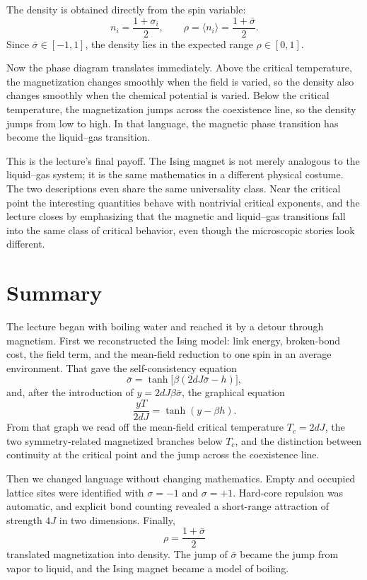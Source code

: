 The density is obtained directly from the spin variable:
\begin{equation}
n_i=\frac{1+\sigma_i}{2},
\qquad
\rho=\langle n_i\rangle=\frac{1+\bar{\sigma}}{2}.
\end{equation}
Since \(\bar{\sigma}\in[-1,1]\), the density lies in the expected range \(\rho\in[0,1]\).

Now the phase diagram translates immediately. Above the critical temperature, the magnetization changes smoothly when the field is varied, so the density also changes smoothly when the chemical potential is varied. Below the critical temperature, the magnetization jumps across the coexistence line, so the density jumps from low to high. In that language, the magnetic phase transition has become the liquid--gas transition.

This is the lecture's final payoff. The Ising magnet is not merely analogous to the liquid--gas system; it is the same mathematics in a different physical costume. The two descriptions even share the same universality class. Near the critical point the interesting quantities behave with nontrivial critical exponents, and the lecture closes by emphasizing that the magnetic and liquid--gas transitions fall into the same class of critical behavior, even though the microscopic stories look different.

\section{Summary}

The lecture began with boiling water and reached it by a detour through magnetism. First we reconstructed the Ising model: link energy, broken-bond cost, the field term, and the mean-field reduction to one spin in an average environment. That gave the self-consistency equation
\[
\bar{\sigma}=\tanh\!\big[\beta(2dJ\bar{\sigma}-h)\big],
\]
and, after the introduction of \(y=2dJ\beta\bar{\sigma}\), the graphical equation
\[
\frac{yT}{2dJ}=\tanh(y-\beta h).
\]
From that graph we read off the mean-field critical temperature \(T_c=2dJ\), the two symmetry-related magnetized branches below \(T_c\), and the distinction between continuity at the critical point and the jump across the coexistence line.

Then we changed language without changing mathematics. Empty and occupied lattice sites were identified with \(\sigma=-1\) and \(\sigma=+1\). Hard-core repulsion was automatic, and explicit bond counting revealed a short-range attraction of strength \(4J\) in two dimensions. Finally,
\[
\rho=\frac{1+\bar{\sigma}}{2}
\]
translated magnetization into density. The jump of \(\bar{\sigma}\) became the jump from vapor to liquid, and the Ising magnet became a model of boiling.